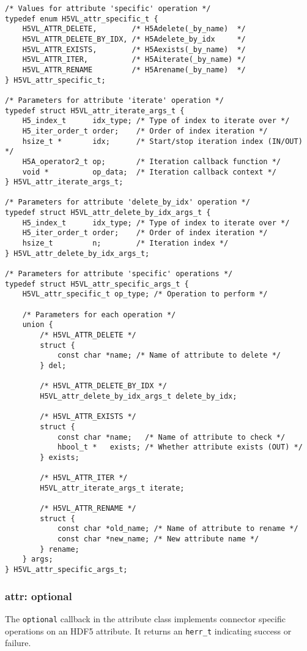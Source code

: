 \begin{lstlisting}
/* Values for attribute 'specific' operation */
typedef enum H5VL_attr_specific_t {
    H5VL_ATTR_DELETE,        /* H5Adelete(_by_name)  */
    H5VL_ATTR_DELETE_BY_IDX, /* H5Adelete_by_idx     */
    H5VL_ATTR_EXISTS,        /* H5Aexists(_by_name)  */
    H5VL_ATTR_ITER,          /* H5Aiterate(_by_name) */
    H5VL_ATTR_RENAME         /* H5Arename(_by_name)  */
} H5VL_attr_specific_t;

/* Parameters for attribute 'iterate' operation */
typedef struct H5VL_attr_iterate_args_t {
    H5_index_t      idx_type; /* Type of index to iterate over */
    H5_iter_order_t order;    /* Order of index iteration */
    hsize_t *       idx;      /* Start/stop iteration index (IN/OUT) */
    H5A_operator2_t op;       /* Iteration callback function */
    void *          op_data;  /* Iteration callback context */
} H5VL_attr_iterate_args_t;

/* Parameters for attribute 'delete_by_idx' operation */
typedef struct H5VL_attr_delete_by_idx_args_t {
    H5_index_t      idx_type; /* Type of index to iterate over */
    H5_iter_order_t order;    /* Order of index iteration */
    hsize_t         n;        /* Iteration index */
} H5VL_attr_delete_by_idx_args_t;

/* Parameters for attribute 'specific' operations */
typedef struct H5VL_attr_specific_args_t {
    H5VL_attr_specific_t op_type; /* Operation to perform */

    /* Parameters for each operation */
    union {
        /* H5VL_ATTR_DELETE */
        struct {
            const char *name; /* Name of attribute to delete */
        } del;

        /* H5VL_ATTR_DELETE_BY_IDX */
        H5VL_attr_delete_by_idx_args_t delete_by_idx;

        /* H5VL_ATTR_EXISTS */
        struct {
            const char *name;   /* Name of attribute to check */
            hbool_t *   exists; /* Whether attribute exists (OUT) */
        } exists;

        /* H5VL_ATTR_ITER */
        H5VL_attr_iterate_args_t iterate;

        /* H5VL_ATTR_RENAME */
        struct {
            const char *old_name; /* Name of attribute to rename */
            const char *new_name; /* New attribute name */
        } rename;
    } args;
} H5VL_attr_specific_args_t;
\end{lstlisting}

\subsubsection{attr: optional}
The \texttt{optional} callback in the attribute class implements connector specific operations on an HDF5 attribute. It returns an \texttt{herr\_t} indicating success or failure. \bigskip

